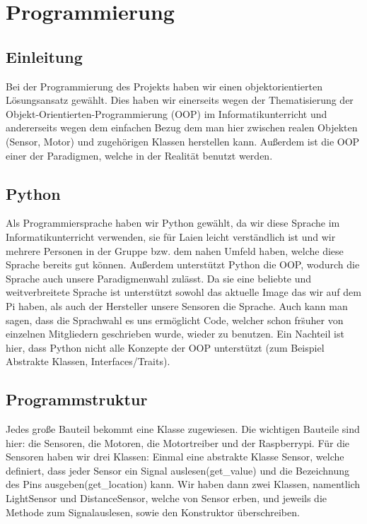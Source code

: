 \documentclass[notitlepage]{report}
\begin{document}
\section{Programmierung}

\subsection{Einleitung}
Bei der Programmierung des Projekts haben wir einen objektorientierten L\"{o}sungsansatz gew\"{a}hlt. Dies haben wir einerseits wegen der Thematisierung der Objekt-Orientierten-Programmierung (OOP) im Informatikunterricht und andererseits wegen dem einfachen Bezug dem man hier zwischen realen Objekten (Sensor, Motor) und zugeh\"{o}rigen Klassen herstellen kann. Au{\ss}erdem ist die OOP einer der Paradigmen, welche in der Realit\"{a}t benutzt werden. 

\subsection{Python}
Als Programmiersprache haben wir Python gew\"{a}hlt, da wir diese Sprache im Informatikunterricht verwenden, sie f\"{u}r Laien leicht verst\"{a}ndlich ist und wir mehrere Personen in der Gruppe bzw. dem nahen Umfeld haben, welche diese Sprache bereits gut k\"{o}nnen. Au{\ss}erdem unterst\"{u}tzt Python die OOP, wodurch die Sprache auch unsere Paradigmenwahl zul\"{a}sst. Da sie eine beliebte und weitverbreitete Sprache ist unterst\"{u}tzt sowohl das aktuelle Image das wir auf dem Pi haben, als auch der Hersteller unsere Sensoren die Sprache. Auch kann man sagen, dass die Sprachwahl es uns erm\"{o}glicht Code, welcher schon fr\"s{u}her von einzelnen Mitgliedern geschrieben wurde, wieder zu benutzen.  Ein Nachteil ist hier, dass Python nicht alle Konzepte der OOP unterst\"{u}tzt (zum Beispiel Abstrakte Klassen, Interfaces/Traits).

\subsection{Programmstruktur}
Jedes gro{\ss}e Bauteil bekommt eine Klasse zugewiesen. Die wichtigen Bauteile sind hier: die Sensoren, die Motoren, die Motortreiber und der Raspberrypi. F\"{u}r die Sensoren haben wir drei Klassen: Einmal eine abstrakte Klasse Sensor, welche definiert, dass jeder Sensor ein Signal auslesen(get\_value) und die Bezeichnung des Pins ausgeben(get\_location) kann. Wir haben dann zwei Klassen, namentlich LightSensor und DistanceSensor, welche von Sensor erben, und jeweils die Methode zum Signalauslesen, sowie den Konstruktor \"{u}berschreiben.
\end{document}
